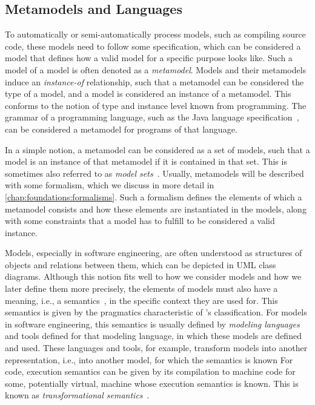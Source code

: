\subsection{Metamodels and Languages}
\label{chap:foundations:modeling:metamodels}

To automatically or semi-automatically process models, such as compiling source code, these models need to follow some specification, which can be considered a model that defines how a valid model for a specific purpose looks like.
Such a model of a model is often denoted as a \emph{metamodel}.
Models and their metamodels induce an \emph{instance-of} relationship, such that a metamodel can be considered the type of a model, and a model is considered an instance of a metamodel.
This conforms to the notion of type and instance level known from programming.
The grammar of a programming language, such as the Java language specification~\cite{gosling2018jls-specification}, can be considered a metamodel for programs of that language.

In a simple notion, a metamodel can be considered as a set of models, such that a model is an instance of that metamodel if it is contained in that set. This is sometimes also referred to as \emph{model sets}~\cite{stevens2020BidirectionalTransformationLarge-SoSym}.
Usually, metamodels will be described with some formalism, which we discuss in more detail in \autoref{chap:foundations:formalisms}.
Such a formalism defines the elements of which a metamodel consists and how these elements are instantiated in the models, along with some constraints that a model has to fulfill to be considered a valid instance.

Models, especially in software engineering, are often understood as structures of objects and relations between them, which can be depicted in \gls{UML} class diagrams.
Although this notion fits well to how we consider models and how we later define them more precisely, the elements of models must also have a meaning, i.e., a semantics~\cite{harel2004semantics-Computer}, in the specific context they are used for.
This semantics is given by the pragmatics characteristic of \citeauthor{stachowiak1973modelltheorie-Book}'s classification.
For models in software engineering, this semantics is usually defined by \emph{modeling languages} and tools defined for that modeling language, in which these models are defined and used.
These languages and tools, for example, transform models into another representation, i.e., into another model, for which the semantics is known
For code, execution semantics can be given by its compilation to machine code for some, potentially virtual, machine whose execution semantics is known.
This is known as \emph{transformational semantics}~\cite{pepper1987transformationalSemantics-SSPC}.

